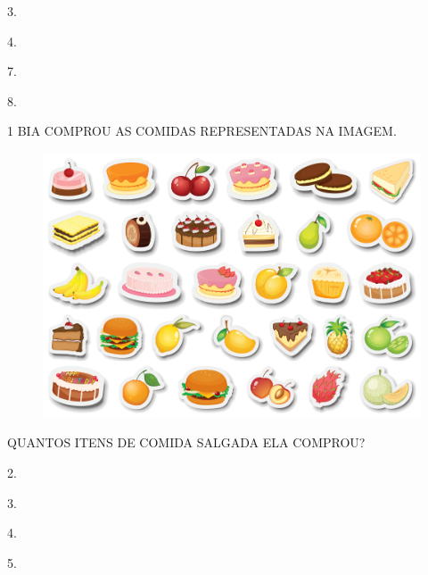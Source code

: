 \begin{multicols}{4}
\begin{escolha}
\item 3.

\item 4.

\item 7.

\item 8.
\end{escolha}
\end{multicols}


\pagebreak


\num{1} BIA COMPROU AS COMIDAS REPRESENTADAS
NA IMAGEM.

\begin{figure}[H]
\centering
\includegraphics[width=\textwidth]{./media/SAEB_1ANO_MAT_FIGURA136.png}
\end{figure}

QUANTOS ITENS DE COMIDA SALGADA ELA COMPROU?

\begin{multicols}{4}
\begin{escolha}[itemsep=0pt]
\item 2.

\item 3.

\item 4.

\item 5.
\end{escolha}
\end{multicols}


